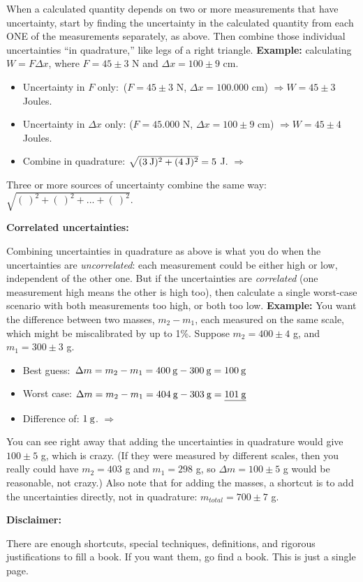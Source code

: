 When a calculated quantity depends on two or more measurements that have uncertainty, start by finding the uncertainty in the calculated quantity from each ONE of the measurements separately, as above.  Then combine those individual uncertainties ``in quadrature,'' like legs of a right triangle. \textbf{Example:} calculating $W=F \Delta x$, where $F=45\pm3$ N and $\Delta x=100\pm9$ cm. 
\begin{itemize} \itemsep1pt
\vspace{-0.35cm}
	\item Uncertainty in $F$ only:   \:\:\,($F=45\pm3$ N, $\Delta x=100.000$ cm) $\Longrightarrow W=45\pm3$ Joules.
	\item Uncertainty in $\Delta x$ only: ($F=45.000$ N, $\Delta x=100\pm9$ cm) $\Longrightarrow W=45\pm4$ Joules.
\vspace{-0.10cm}
		\item Combine in quadrature: $\sqrt{(3 \:\rm{J})^2+(4 \:\rm{J} )^2 } =5$ J.  $\Longrightarrow$ 
\end{itemize}
\vspace{-0.35cm}
Three or more sources of uncertainty combine the same way: $\sqrt{(\:)^2 + (\:)^2 +...+ (\:)^2 }$.
\vspace{+0.15cm}

\textbf{Correlated uncertainties:}
\vspace{-0.15cm}

Combining uncertainties in quadrature as above is what you do when the uncertainties are \textit{uncorrelated}: each measurement could be either high or low, independent of the other one.  But if the uncertainties are \textit{correlated} (one measurement high means the other is high too), then calculate a single worst-case scenario with both measurements too high, or both too low. \textbf{Example:} You want the difference between two masses, $m_2-m_1$, each measured on the same scale, which might be miscalibrated by up to 1\%.  Suppose $m_2=400\pm4$ g, and $m_1=300\pm3$ g. 
\begin{itemize} \itemsep1pt
\vspace{-0.35cm}
	\item Best guess: $\,\Delta m=m_2-m_1=400 \:\rm{ g}-300 \:\rm{ g} = 100 \:\rm{ g}$
	\item Worst case: $  \Delta m=m_2-m_1=404 \:\rm{ g}-303 \:\rm{ g} = \underline{ 101 \:\rm{ g}}$
\vspace{-0.15cm}
	\item Difference of: \hspace{151pt}                        $1 \:\rm{g}$. $\Longrightarrow$ 
\end{itemize}
\vspace{-0.35cm}
You can see right away that adding the uncertainties in quadrature would give $100\pm5$ g, which is crazy.  (If they were measured by different scales, then you really could have $m_2=403$ g and $m_1=298$ g, so $\Delta m=100\pm 5$ g would be reasonable, not crazy.)  Also note that for adding the masses, a shortcut is to add the uncertainties directly, not in quadrature: $m_{total}=700\pm 7$ g.
\vspace{+0.15cm}

\textbf{Disclaimer:}
\vspace{-0.15cm}

There are enough shortcuts, special techniques, definitions, and rigorous justifications to fill a book. If you want them, go find a book.  This is just a single page.


